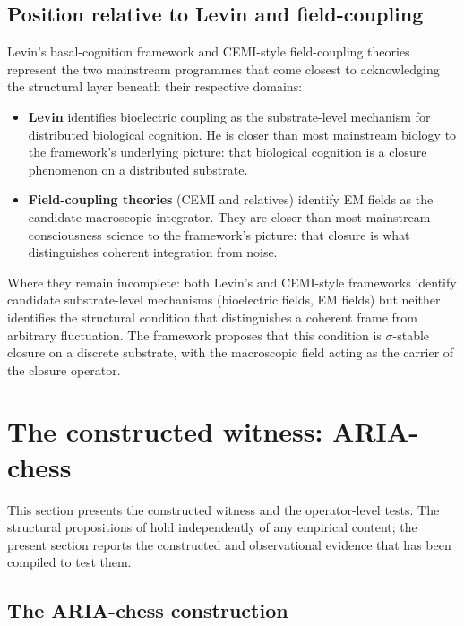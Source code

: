\documentclass[11pt]{article}
\theoremstyle{plain}
\theoremstyle{definition}
\theoremstyle{remark}
\begin{document}
\subsection{Position relative to Levin and field-coupling}

Levin's basal-cognition framework and CEMI-style field-coupling theories represent the two mainstream programmes that come closest to acknowledging the structural layer beneath their respective domains:

\begin{itemize}[leftmargin=2em]
\item \textbf{Levin} identifies bioelectric coupling as the substrate-level mechanism for distributed biological cognition. He is closer than most mainstream biology to the framework's underlying picture: that biological cognition is a closure phenomenon on a distributed substrate.
\item \textbf{Field-coupling theories} (CEMI and relatives) identify EM fields as the candidate macroscopic integrator. They are closer than most mainstream consciousness science to the framework's picture: that closure is what distinguishes coherent integration from noise.
\end{itemize}

Where they remain incomplete: both Levin's and CEMI-style frameworks identify candidate substrate-level mechanisms (bioelectric fields, EM fields) but neither identifies the structural condition that distinguishes a coherent frame from arbitrary fluctuation. The framework proposes that this condition is $\sigma$-stable closure on a discrete substrate, with the macroscopic field acting as the carrier of the closure operator.

\section{The constructed witness: ARIA-chess}\label{sec:aria}

This section presents the constructed witness and the operator-level tests. The structural propositions of \citet{SmartExistenceClosure} hold independently of any empirical content; the present section reports the constructed and observational evidence that has been compiled to test them.

\subsection{The ARIA-chess construction}\label{sec:aria-construction}
\end{document}
